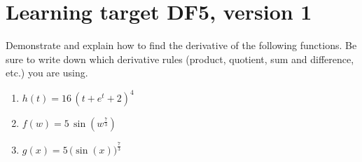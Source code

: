 \section{Learning target DF5, version 1}
\providecommand{\stxKnowl}{}\renewcommand{\stxKnowl}[1]{#1}
\providecommand{\stxOuttro}{}\renewcommand{\stxOuttro}[1]{#1}
\providecommand{\stxTitle}{}\renewcommand{\stxTitle}[1]{#1}
\renewcommand{\stxOuttro}[1]{}
\stxKnowl{
 Demonstrate and explain how to find the derivative of the following functions. Be sure to write down which derivative rules (product, quotient, sum and difference, etc.) you are using. 

\begin{enumerate}
\item
\stxKnowl{
\(h(t)= 16 \, {\left(t + e^{t} + 2\right)}^{4}\)

\stxOuttro{
\[h' (t)= 64 \, {\left(t + e^{t} + 2\right)}^{3} {\left(e^{t} + 1\right)}\]

}
}
\vfill
\item
\stxKnowl{
\(f(w)= 5 \, \sin\left(w^{\frac{7}{3}}\right)\)

\stxOuttro{
\[f' (w)= \frac{35}{3} \, w^{\frac{4}{3}} \cos\left(w^{\frac{7}{3}}\right)\]

}
}
\vfill
\item
\stxKnowl{
\(g(x)= 5 \, \Big(\sin\left(x\right)\Big)^{\frac{7}{3}}\)

\stxOuttro{
\[g' (x)= \frac{35}{3} \, \cos\left(x\right) \sin\left(x\right)^{\frac{4}{3}}\]

}
}
\vfill
\end{enumerate}
}

\pagebreak

